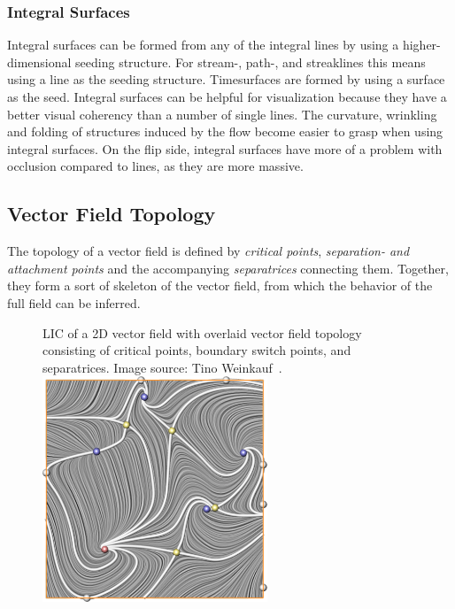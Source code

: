 \subsubsection{Integral Surfaces} %
\label{ssub:integral_surfaces}
%
Integral surfaces can be formed from any of the integral lines by using a
higher-dimensional seeding structure.
%
For stream-, path-, and streaklines this means using a line as the seeding
structure.
%
Timesurfaces are formed by using a surface as the seed.
%
Integral surfaces can be helpful for visualization because they have a better
visual coherency than a number of single lines.
%
The curvature, wrinkling and folding of structures induced by the flow become
easier to grasp when using integral surfaces.
%
On the flip side, integral surfaces have more of a problem with occlusion
compared to lines, as they are more massive.
%

%
%
\subsection{Vector Field Topology} %
\label{sub:vector_field_topology}
%
%
The topology of a vector field is defined by \emph{critical points},
\emph{separation- and attachment points} and the accompanying
\emph{separatrices} connecting them.
%
Together, they form a sort of skeleton of the vector field, from which the
behavior of the full field can be inferred.
%
\begin{figure}[t]
    \begin{captionbeside}
        {\ac{LIC} of a \ac{2D} vector field with overlaid vector field topology
        consisting of critical points, boundary switch points, and separatrices.
        Image source: Tino Weinkauf~\cite{Weinkauf2008}.\label{fig:lic_topo}}
        \includegraphics[width=0.6\textwidth]{figures/lic_topology.png}
    \end{captionbeside}
\end{figure}
%

